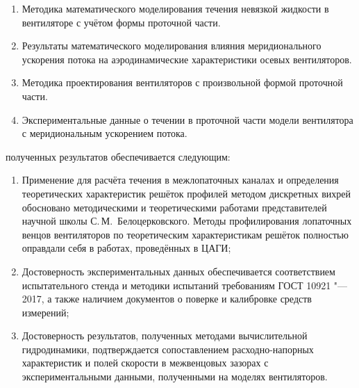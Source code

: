 {}
\begin{enumerate}[beginpenalty=10000] %
	\item
	Методика математического моделирования течения невязкой жидкости в вентиляторе с учётом формы проточной части.

	\item
	Результаты математического моделирования влияния меридионального ускорения потока на аэродинамические характеристики осевых вентиляторов.

	\item
	Методика проектирования вентиляторов с произвольной формой проточной части.

	\item
	Экспериментальные данные о течении в проточной части модели вентилятора с меридиональным ускорением потока.

\end{enumerate}

{\reliability} полученных результатов обеспечивается следующим:
\begin{enumerate}[beginpenalty=10000]
	\item
	Применение для расчёта течения в межлопаточных каналах и определения теоретических характеристик решёток профилей методом дискретных вихрей обосновано методическими и теоретическими работами представителей научной школы С.\,М.~Белоцерковского.
	Методы профилирования лопаточных венцов вентиляторов по теоретическим характеристикам решёток полностью оправдали себя в работах, проведённых в ЦАГИ;
	\item
	Достоверность экспериментальных данных обеспечивается соответствием испытательного стенда и методики испытаний требованиям ГОСТ 10921 "--- 2017, а также наличием документов о поверке и калибровке средств измерений;
	\item
	Достоверность результатов, полученных методами вычислительной гидродинамики, подтверждается сопоставлением расходно-напорных характеристик и полей скорости в межвенцовых зазорах с экспериментальными данными, полученными на моделях вентиляторов.
\end{enumerate}

